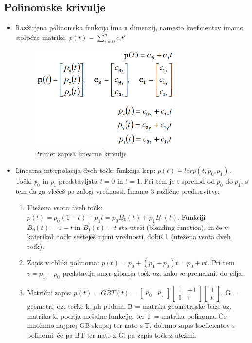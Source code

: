 \documentclass{article}
\begin{document}
\subsection{Polinomske krivulje}
\begin{itemize}
    \item Razžirjena polinomska funkcija ima n dimenzij, namesto koeficientov imamo stolpčne matrike. $p(t) = \sum_{i=0}^n c_it^i$
        \begin{figure}[H]
        \centering
        \includegraphics[width=75mm]{src/zapis_polinomske_krivulje.png}
        \caption{Primer zapisa linearne krivulje}
        \end{figure} 
    \item Linearna interpolacija dveh točk: funkcija lerp: $p(t) = lerp(t, p_0, p_1)$. Točki $p_0$ in $p_1$ predstavljata $t=0$ in $t=1$. Pri tem je t sprehod od $p_0$ do $p_1$, s tem da ga vlečeš po zalogi vrednosti. Imamo 3 različne predstavitve:
    \begin{enumerate}
        \item Utežena vsota dveh točk: $p(t) = p_0(1-t) + p_1t = p_0B_0(t) + p_1B_1(t)$. Funkciji $B_0(t) = 1 - t$ in $B_1(t) = t$ sta uteži (blending function), in če v katerikoli točki sešteješ njuni vrednosti, dobiš 1 (utežena vsota dveh točk). 
        \item Zapis v obliki polinoma: $p(t) = p_0 + (p_1 - p_0)t = p_0 + vt$. Pri tem $v = p_1 - p_0$ predstavlja smer gibanja točk oz. kako se premaknit do cilja. 
        \item Matrični zapis: $p(t) = GBT(t) = \begin{bmatrix} p_0 & p_1 \end{bmatrix} \begin{bmatrix} 1 & -1 \\ 0 & 1 \end{bmatrix} \begin{bmatrix} 1 \\ t \end{bmatrix}$, G = geometrij oz. točke ki jih podam, B = matrika geometrijske baze oz. matrika ki podaja mešalne funkcije, ter T = matrika polinoma. Če množimo najprej GB skupaj ter nato s T, dobimo zapis koeficientov s polinomi, če pa BT ter nato z G, pa zapis točk z utežmi.

\end{enumerate}
\end{itemize}
\end{document}
